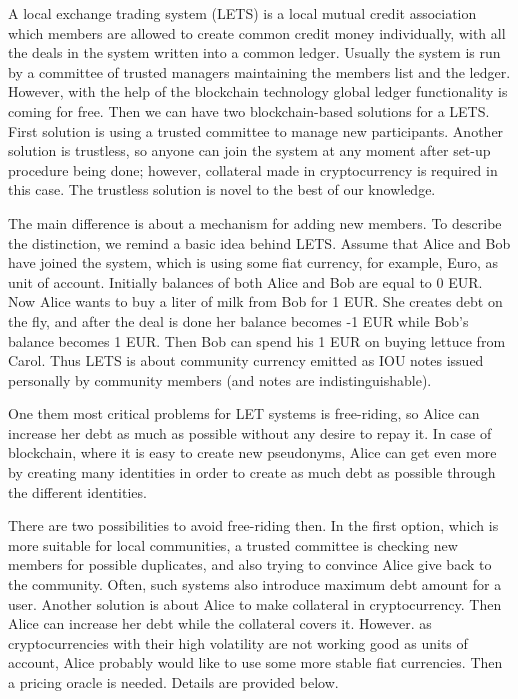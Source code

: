 \documentclass[]{llncs}   %
\begin{document}
A local exchange trading system (LETS)\cite{williams1996local} is a local mutual credit association which members are allowed to create common credit money individually, with all the deals in the system written into a common ledger. Usually the system is run by a committee of 
trusted managers maintaining the members list and the ledger. However, with the help of the blockchain technology global ledger functionality is coming for free. Then 
we can have two blockchain-based solutions for a LETS. First solution is using a trusted committee to manage new participants. Another 
solution is trustless, so anyone can join the system at any moment after set-up procedure being done; however, collateral made in cryptocurrency is required in this case. The trustless solution is novel to the best of our knowledge.

The main difference is about a mechanism for adding new members. To describe the distinction, we remind a basic idea behind LETS. Assume that Alice and Bob have joined the system, which is using some fiat currency, for example, Euro, as unit of account. Initially
balances of both Alice and Bob are equal to 0 EUR. Now Alice wants to buy a liter of milk from Bob for 1 EUR. She creates debt on the fly, and after the deal is done her balance becomes -1 EUR while Bob's balance becomes 1 EUR. Then Bob can spend his 1 EUR on buying lettuce from Carol. Thus LETS is about community currency emitted as IOU notes issued personally by community members (and notes are indistinguishable).

One them most critical problems for LET systems is free-riding, so Alice can increase her debt as much as possible without any desire to repay it. In case of blockchain, where it is easy to create new pseudonyms, Alice can get even more by creating many identities in order to create as much debt as possible through the different identities.

There are two possibilities to avoid free-riding then. In the first option, which is more suitable for local communities, a trusted committee is checking new members for possible duplicates, and also trying to convince Alice give back to the community. Often, such systems also introduce maximum debt amount for a user. Another solution is about Alice to make collateral in cryptocurrency. Then Alice
can increase her debt while the collateral covers it. However. as cryptocurrencies with their high volatility are not working good as units of account, Alice probably would like to use some more stable fiat currencies. Then a pricing oracle is needed. Details are provided below.
\end{document}

